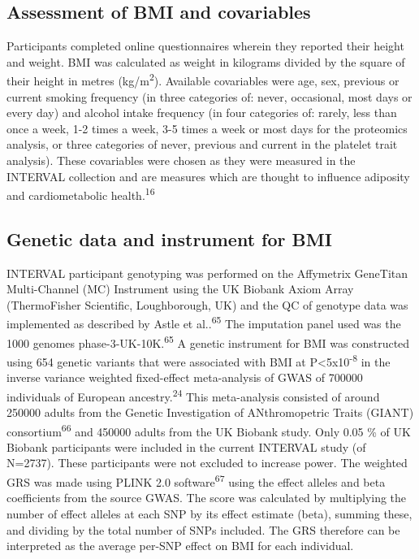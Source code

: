 \documentclass[11pt,twoside]{bristolthesis}
\begin{document}
\hypertarget{assessment-of-bmi-and-covariables}{%
\subsection{Assessment of BMI and covariables}\label{assessment-of-bmi-and-covariables}}

Participants completed online questionnaires wherein they reported their height and weight. BMI was calculated as weight in kilograms divided by the square of their height in metres (kg/m\textsuperscript{2}). Available covariables were age, sex, previous or current smoking frequency (in three categories of: never, occasional, most days or every day) and alcohol intake frequency (in four categories of: rarely, less than once a week, 1-2 times a week, 3-5 times a week or most days for the proteomics analysis, or three categories of never, previous and current in the platelet trait analysis). These covariables were chosen as they were measured in the INTERVAL collection and are measures which are thought to influence adiposity and cardiometabolic health.\textsuperscript{16}

\hypertarget{genetic-data-and-instrument-for-bmi}{%
\subsection{Genetic data and instrument for BMI}\label{genetic-data-and-instrument-for-bmi}}

INTERVAL participant genotyping was performed on the Affymetrix GeneTitan Multi-Channel (MC) Instrument using the UK Biobank Axiom Array (ThermoFisher Scientific, Loughborough, UK) and the QC of genotype data was implemented as described by Astle et al..\textsuperscript{65} The imputation panel used was the 1000 genomes phase-3-UK-10K.\textsuperscript{65} A genetic instrument for BMI was constructed using 654 genetic variants that were associated with BMI at P\textless5x10\textsuperscript{-8} in the inverse variance weighted fixed-effect meta-analysis of GWAS of 700000 individuals of European ancestry.\textsuperscript{24} This meta-analysis consisted of around 250000 adults from the Genetic Investigation of ANthromopetric Traits (GIANT) consortium\textsuperscript{66} and 450000 adults from the UK Biobank study. Only 0.05 \% of UK Biobank participants were included in the current INTERVAL study (of N=2737). These participants were not excluded to increase power. The weighted GRS was made using PLINK 2.0 software\textsuperscript{67} using the effect alleles and beta coefficients from the source GWAS. The score was calculated by multiplying the number of effect alleles at each SNP by its effect estimate (beta), summing these, and dividing by the total number of SNPs included. The GRS therefore can be interpreted as the average per-SNP effect on BMI for each individual.
\end{document}
